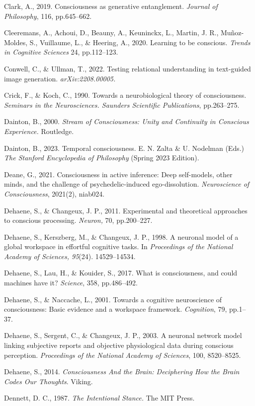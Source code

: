 \documentclass[12pt]{article}
\begin{document}
Clark, A., 2019. Consciousness as generative entanglement. \emph{Journal
of Philosophy}, 116, pp.645--662.

Cleeremans, A., Achoui, D., Beauny, A., Keuninckx, L., Martin, J. R.,
Muñoz-Moldes, S., Vuillaume, L., \& Heering, A., 2020. Learning to be
conscious. \emph{Trends in Cognitive Sciences} 24, pp.112--123.

Conwell, C., \& Ullman, T., 2022. Testing relational understanding in
text-guided image generation. \emph{arXiv:2208.00005.}

Crick, F., \& Koch, C., 1990. Towards a neurobiological theory of
consciousness. \emph{Seminars in the Neurosciences. Saunders Scientific
Publications}, pp.263--275.

Dainton, B., 2000. \emph{Stream of Consciousness: Unity and Continuity
in Conscious Experience.} Routledge.

Dainton, B., 2023. Temporal consciousness. E. N. Zalta \& U. Nodelman
(Eds.) \emph{The Stanford Encyclopedia of Philosophy} (Spring 2023
Edition).

Deane, G., 2021. Consciousness in active inference: Deep self-models,
other minds, and the challenge of psychedelic-induced ego-dissolution.
\emph{Neuroscience of Consciousness}, 2021(2), niab024.

Dehaene, S., \& Changeux, J. P., 2011. Experimental and theoretical
approaches to conscious processing. \emph{Neuron,} 70, pp.200--227.

Dehaene, S., Kerszberg, M., \& Changeux, J. P., 1998. A neuronal model
of a global workspace in effortful cognitive tasks. In \emph{Proceedings
of the National Academy of Sciences, 95}(24). 14529--14534.

Dehaene, S., Lau, H., \& Kouider, S., 2017. What is consciousness, and
could machines have it? \emph{Science}, 358, pp.486--492.

Dehaene, S., \& Naccache, L., 2001. Towards a cognitive neuroscience of
consciousness: Basic evidence and a workspace framework.
\emph{Cognition}, 79, pp.1--37.

Dehaene, S., Sergent, C., \& Changeux, J. P., 2003. A neuronal network
model linking subjective reports and objective physiological data during
conscious perception. \emph{Proceedings of the National Academy of
Sciences}, 100, 8520--8525.

Dehaene, S., 2014. \emph{Consciousness And the Brain: Deciphering How
the Brain Codes Our Thoughts}. Viking.

Dennett, D. C., 1987. \emph{The Intentional Stance.} The MIT Press.
\end{document}

